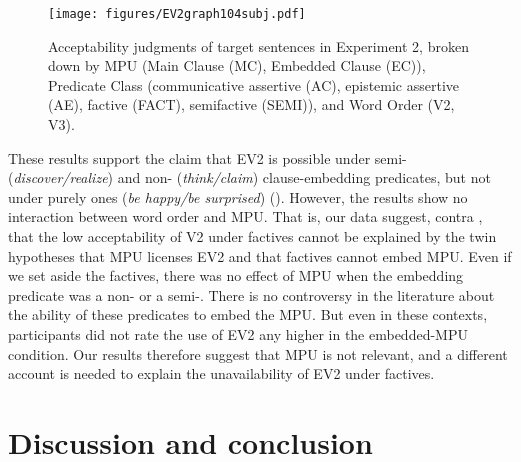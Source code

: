 \documentclass[output=paper]{langsci/langscibook}
\begin{document}
\begin{figure}
\texttt{[image: figures/EV2graph104subj.pdf]}
\caption{Acceptability judgments of target sentences in Experiment 2, broken down by MPU (Main Clause (MC), Embedded Clause (EC)),  Predicate Class (communicative assertive (AC), epistemic assertive (AE), factive (FACT), semifactive (SEMI)), and Word Order (V2, V3).}
\label{fig:ev2:swedishStudy}
\end{figure}

These results support the claim that  EV2 is possible under semi- (\textit{discover/realize}) and non- (\textit{think/claim}) clause-embedding predicates, but not under purely  ones (\textit{be happy/be surprised}) (\citealt{WiklundEtAl2009}).    However, the results show no interaction between word order and MPU. That is, our data suggest, contra \citet{JensenChristensen2013}, that the low acceptability of V2 under factives cannot be explained by the twin hypotheses that MPU licenses EV2 and that factives cannot embed MPU.  Even if we set aside the factives, there was no effect of MPU when the embedding predicate was a non- or a semi-. There is no controversy in the literature about the ability of these predicates to embed the MPU. But even in these contexts, participants did not rate the use of EV2 any higher in the embedded-MPU condition.  Our results therefore suggest that MPU is not relevant, and a different account is needed to explain the unavailability of EV2 under factives.

\section{Discussion and conclusion}
\end{document}
